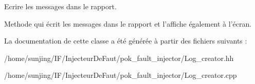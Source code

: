 Ecrire les messages dans le rapport. 

Methode qui écrit les messages dans le rapport et l’affiche également à l’écran. 

La documentation de cette classe a été générée à partir des fichiers suivants :\begin{DoxyCompactItemize}
\item 
/home/sunjing/IF/InjecteurDeFaut/pok\_\-fault\_\-injector/Log\_\-creator.hh\item 
/home/sunjing/IF/InjecteurDeFaut/pok\_\-fault\_\-injector/Log\_\-creator.cpp\end{DoxyCompactItemize}
